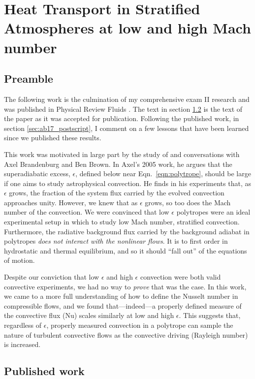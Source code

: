 \chapter{Heat Transport in Stratified Atmospheres at low and high Mach number}
\label{ch:ab17}

\section{Preamble}
The following work is the culmination of my comprehensive exam II research and was published in Physical Review Fluids \citep{anders&brown2017}.
The text in section \ref{sec:ab17_published} is the text of the paper as it was accepted for publication.
Following the published work, in section \ref{sec:ab17_postscript}, I comment on a few lessons that have been learned since we published these results.

This work was motivated in large part by the study of \citet{brandenburg&all2005} and conversations with Axel Brandenburg and Ben Brown.
In Axel's 2005 work, he argues that the superadiabatic excess, $\epsilon$, defined below near Eqn.~\ref{eqn:polytrope}, should be large if one aims to study astrophysical convection.
He finds in his experiments that, as $\epsilon$ grows, the fraction of the system flux carried by the evolved convection approaches unity.
However, we knew that as $\epsilon$ grows, so too does the Mach number of the convection.
We were convinced that low $\epsilon$ polytropes were an ideal experimental setup in which to study low Mach number, stratified convection.
Furthermore, the radiative background flux carried by the background adiabat in polytropes \emph{does not interact with the nonlinear flows}.
It is to first order in hydrostatic and thermal equilibrium, and so it should ``fall out'' of the equations of motion.

Despite our conviction that low $\epsilon$ and high $\epsilon$ convection were both valid convective experiments, we had no way to \emph{prove} that was the case.
In this work, we came to a more full understanding of how to define the Nusselt number in compressible flows, and we found that---indeed---a properly defined measure of the convective flux (Nu) scales similarly at low and high $\epsilon$.
This suggests that, regardless of $\epsilon$, properly measured convection in a polytrope can sample the nature of turbulent convective flows as the convective driving (Rayleigh number) is increased.


\section{Published work}
\label{sec:ab17_published}


